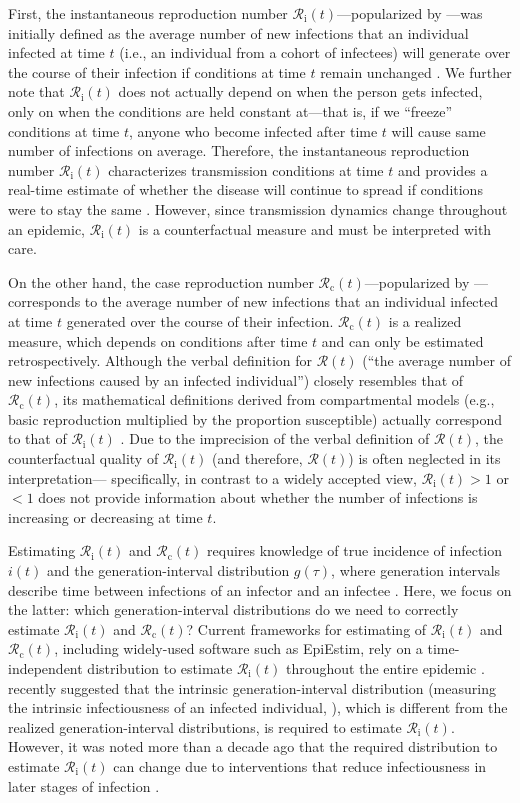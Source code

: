 \documentclass[12pt]{article}
\newcommand{\Rx}[1]{\ensuremath{{\mathcal R}_{#1}}\xspace}
\newcommand{\Rc}{\Rx{\mathrm{c}}}
\newcommand{\Ri}{\Rx{\mathrm{i}}}
\newcommand{\RR}{\ensuremath{{\mathcal R}}\xspace}
\begin{document}
First, the instantaneous reproduction number $\Ri(t)$---popularized by \cite{cori2013new}---was initially defined as the average number of new infections that an individual infected at time $t$ (i.e., an individual from a cohort of infectees) will generate over the course of their infection if conditions at time $t$ remain unchanged \citep{fraser2007estimating}. 
We further note that $\Ri(t)$ does not actually depend on when the person gets infected, only on when the conditions are held constant at---that is, if we ``freeze'' conditions at time $t$, anyone who become infected after time $t$ will cause same number of infections on average.
Therefore, the instantaneous reproduction number $\Ri(t)$ characterizes transmission conditions at time $t$ and provides a real-time estimate of whether the disease will continue to spread if conditions were to stay the same \citep{gostic2020practical}.
However, since transmission dynamics change throughout an epidemic, $\Ri(t)$ is a counterfactual measure and must be interpreted with care.

On the other hand, the case reproduction number $\Rc(t)$---popularized by \cite{wallinga2004different}---corresponds to the average number of new infections that an individual infected at time $t$ generated over the course of their infection.
$\Rc(t)$ is a realized measure, which depends on conditions after time $t$ and can only be estimated retrospectively.
Although the verbal definition for $\RR(t)$ (``the average number of new infections caused by an infected individual'') closely resembles that of $\Rc(t)$, its mathematical definitions derived from compartmental models (e.g., basic reproduction multiplied by the proportion susceptible) actually correspond to that of $\Ri(t)$ \citep{gostic2020practical}.
Due to the imprecision of the verbal definition of $\RR(t)$, the counterfactual quality of $\Ri(t)$ (and therefore, $\RR(t)$) is often neglected in its interpretation---
specifically, in contrast to a widely accepted view, $\Ri(t) > 1$ or $<1$ does not provide information about whether the number of infections is increasing or decreasing at time $t$.

Estimating $\Ri(t)$ and $\Rc(t)$ requires knowledge of true incidence of infection $i(t)$ and the generation-interval distribution $g(\tau)$, where generation intervals describe time between infections of an infector and an infectee \citep{svensson2007note}.
Here, we focus on the latter: which generation-interval distributions do we need to correctly estimate $\Ri(t)$ and $\Rc(t)$?
Current frameworks for estimating of $\Ri(t)$ and $\Rc(t)$, including widely-used software such as EpiEstim, rely on a time-independent distribution to estimate $\Ri(t)$ throughout the entire epidemic \citep{cori2013new}.
\cite{gostic2020practical} recently suggested that the intrinsic generation-interval distribution (measuring the intrinsic infectiousness of an infected individual, \cite{champredon2015intrinsic}), which is different from the realized generation-interval distributions, is required to estimate $\Ri(t)$.
However, it was noted more than a decade ago that the required distribution to estimate $\Ri(t)$ can change due to interventions that reduce infectiousness in later stages of infection \citep{fraser2007estimating}.
\end{document}
